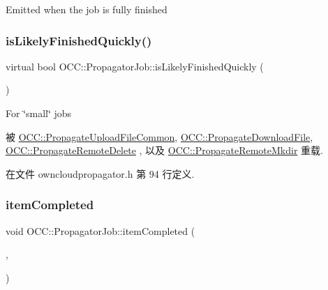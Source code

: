 Emitted when the job is fully finished \mbox{\label{class_o_c_c_1_1_propagator_job_a1272ff804d4daf4798f08af6f654944d}} 
\subsubsection{\texorpdfstring{is\+Likely\+Finished\+Quickly()}{isLikelyFinishedQuickly()}}
{\footnotesize\ttfamily virtual bool O\+C\+C\+::\+Propagator\+Job\+::is\+Likely\+Finished\+Quickly (\begin{DoxyParamCaption}{ }\end{DoxyParamCaption})\hspace{0.3cm}{\ttfamily [virtual]}}

For \char`\"{}small\char`\"{} jobs 

被 \hyperlink{class_o_c_c_1_1_propagate_upload_file_common_a1701db58050bde4a96816d7da7ad0430}{O\+C\+C\+::\+Propagate\+Upload\+File\+Common}, \hyperlink{class_o_c_c_1_1_propagate_download_file_a70add8f78720fbedddca87fc139ac737}{O\+C\+C\+::\+Propagate\+Download\+File}, \hyperlink{class_o_c_c_1_1_propagate_remote_delete_ae58450c9a1deb1d19f52c8f057efbcc0}{O\+C\+C\+::\+Propagate\+Remote\+Delete} , 以及 \hyperlink{class_o_c_c_1_1_propagate_remote_mkdir_a440d6d170f440c0e681198d1bfd4efda}{O\+C\+C\+::\+Propagate\+Remote\+Mkdir} 重载.



在文件 owncloudpropagator.\+h 第 94 行定义.

\mbox{\label{class_o_c_c_1_1_propagator_job_aee4dac27675315a4b0116c0056e2f564}} 
\subsubsection{\texorpdfstring{item\+Completed}{itemCompleted}}
{\footnotesize\ttfamily void O\+C\+C\+::\+Propagator\+Job\+::item\+Completed (\begin{DoxyParamCaption}\item[{const \hyperlink{class_o_c_c_1_1_sync_file_item}{Sync\+File\+Item} \&}]{,  }\item[{const \hyperlink{class_o_c_c_1_1_propagator_job}{Propagator\+Job} \&}]{ }\end{DoxyParamCaption})\hspace{0.3cm}{\ttfamily [signal]}}

